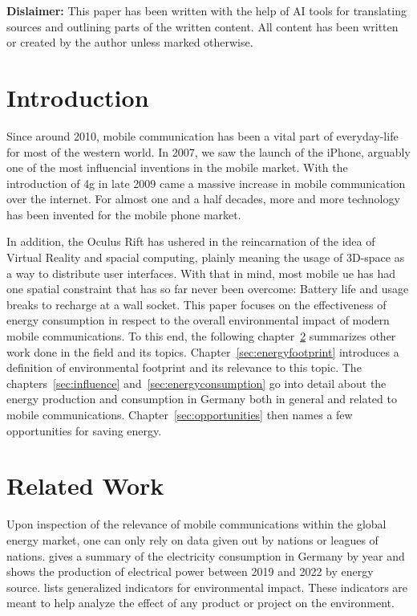 \documentclass[11pt,a4paper]{article}
\begin{document}
\noindent\textbf{Dislaimer:} This paper has been written with the help of AI tools for translating sources and outlining parts of the written content.
All content has been written or created by the author unless marked otherwise.

\tableofcontents

\section{Introduction}\label{sec:intro}
Since around 2010, mobile communication has been a vital part of everyday-life for most of the western world.
In 2007, we saw the launch of the iPhone, arguably one of the most influencial inventions in the mobile market.
With the introduction of \acrfull{4g} in late 2009 came a massive increase in mobile communication over the internet.
For almost one and a half decades, more and more technology has been invented for the mobile phone market.

In addition, the Oculus Rift has ushered in the reincarnation of the idea of Virtual Reality and spacial computing, plainly meaning the usage of 3D-space as a way to distribute user interfaces.
With that in mind, most mobile \acrfull{ue} has had one spatial constraint that has so far never been overcome: Battery life and usage breaks to recharge at a wall socket.
This paper focuses on the effectiveness of energy consumption in respect to the overall environmental impact of modern mobile communications.
To this end, the following chapter~\ref{sec:relatedwork} summarizes other work done in the field and its topics.
Chapter~\ref{sec:energyfootprint} introduces a definition of environmental footprint and its relevance to this topic.
The chapters~\ref{sec:influence} and~\ref{sec:energyconsumption} go into detail about the energy production and consumption in Germany both in general and related to mobile communications.
Chapter~\ref{sec:opportunities} then names a few opportunities for saving energy.

\section{Related Work}\label{sec:relatedwork}

Upon inspection of the relevance of mobile communications within the global energy market, one can only rely on data given out by nations or leagues of nations.
\citep{Stromverbrauch} gives a summary of the electricity consumption in Germany by year and \citep{Bruttostromerzeugung} shows the production of electrical power between 2019 and 2022 by energy source.
\citep{Umweltindikatoren} lists generalized indicators for environmental impact.
These indicators are meant to help analyze the effect of any product or project on the environment.
\end{document}
